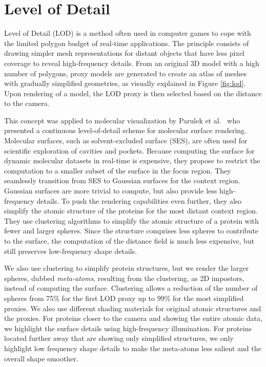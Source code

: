 \section{Level of Detail}

Level of Detail (LOD) is a method often used in computer games to cope with the limited polygon budget of real-time applications.
The principle consists of drawing simpler mesh representations for distant objects that have less pixel coverage to reveal high-frequency details. 
From an original 3D model with a high number of polygons, proxy models are generated to create an atlas of meshes with gradually simplified geometries, as visually explained in Figure \ref{fig:lod}.
Upon rendering of a model, the LOD proxy is then selected based on the distance to the camera.

This concept was applied to molecular visualization by Parulek et al.~\cite{parulek2014continuous} who presented a continuous level-of-detail scheme for molecular surface rendering.
Molecular surfaces, such as solvent-excluded surface (SES), are often used for scientific exploration of cavities and pockets.
Because computing the surface for dynamic molecular datasets in real-time is expensive, they propose to restrict the computation to a smaller subset of the surface in the focus region.
They seamlessly transition from SES to Gaussian surfaces for the context region.
Gaussian surfaces are more trivial to compute, but also provide less high-frequency details.
To push the rendering capabilities even further, they also simplify the atomic structure of the proteins for the most distant context region.
They use clustering algorithms to simplify the atomic structure of a protein with fewer and larger spheres.
Since the structure comprises less spheres to contribute to the surface, the computation of the distance field is much less expensive, but still preserves low-frequency shape details.

We also use clustering to simplify protein structures, but we render the larger spheres, dubbed \textit{meta-atoms}, resulting from the clustering, as 2D impostors, instead of computing the surface.
Clustering allows a reduction of the number of spheres from 75\% for the first LOD proxy up to 99\% for the most simplified proxies.
We also use different shading materials for original atomic structures and the proxies.
For proteins closer to the camera and showing the entire atomic data, we highlight the surface details using high-frequency illumination.
For proteins located further away that are showing only simplified structures, we only highlight low frequency shape details to make the meta-atoms less salient and the overall shape smoother.


